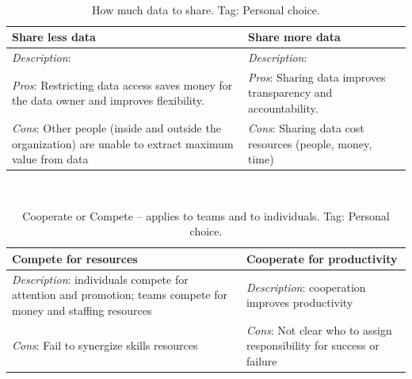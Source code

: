 \ \\

\begin{center}
\begin{table}[ht]
\begin{tabular}{ | m{\dilemmatablewidth}| m{\dilemmatablewidth} | } 
  \hline
  \textbf{Share less data} &
  \textbf{Share more data} \\
  \hline
  \textit{Description}:  &
  \textit{Description}:  \\  
  \hline
  \textit{Pros}: Restricting data access saves money for the data owner and improves flexibility.&
  \textit{Pros}: Sharing data improves transparency and accountability. \\
  \hline
  \textit{Cons}: Other people (inside and outside the organization) are unable to extract maximum value from data & 
  \textit{Cons}: Sharing data cost resources (people, money, time) \\
  \hline
\end{tabular}
\caption{How much data to share.
{\tiny Tag: Personal choice.}
}
\label{table:data_share-vs-hide}
\end{table}
\end{center}

\ \\

\begin{center}
\begin{table}[ht]
\begin{tabular}{ | m{\dilemmatablewidth}| m{\dilemmatablewidth} | } 
  \hline
  \textbf{Compete for resources} &
  \textbf{Cooperate for productivity} \\
  \hline
  \textit{Description}: individuals compete for attention and promotion; teams compete for money and staffing resources &
  \textit{Description}: cooperation improves productivity \\  
  \hline
  \textit{Cons}: Fail to synergize skills resources & 
  \textit{Cons}: Not clear who to assign responsibility for success or failure \\
  \hline
\end{tabular}
\caption{Cooperate or Compete -- applies to teams and to individuals. 
{\tiny Tag: Personal choice.}
}
\label{table:cooperate-vs-compete}
\end{table}
\end{center}

\ \\

